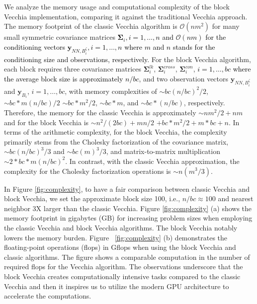 \documentclass[12pt]{article}
\begin{document}
We analyze the memory usage and computational complexity of the block Vecchia implementation, comparing it against the traditional Vecchia approach. The memory footprint of the classic Vecchia algorithm is $\mathcal{O}(nm^2)$ for many small symmetric covariance matrices \textcolor{black}{$\boldsymbol{\Sigma}_{i}, i=1, \ldots, n$ and $\mathcal{O}(nm)$ for the conditioning vectors $\boldsymbol{y}_{NN, B^{\zeta}_i}, i=1, \ldots, n$ where $m$ and $n$ stands for the conditioning size and observations, respectively.} 
For the block Vecchia algorithm, each block requires three covariance matrices $\boldsymbol{\Sigma}_i^{lk}$, $\boldsymbol{\Sigma}_i^{cross}$, $\boldsymbol{\Sigma}_i^{con}$, \textcolor{black}{$i=1, \ldots, bc$ where the average block size is approximately $n/bc$},  and two observation vectors $\boldsymbol{y}_{NN, B^{\zeta}_i}$ and $\boldsymbol{y}_{B_i}$, $i=1, \ldots, bc$, with memory complexities of $\sim{bc(n/bc)^2/2}$, $\sim{bc*m(n/bc)/2}$ $\sim{bc*m^2/2}$, $\sim{bc*m}$, and $\sim{bc*(n/bc)}$, respectively. Therefore, the memory for the classic Vecchia is approximately $\sim{nm^2/2 + nm}$ and for the block Vecchia is $\sim{n^2/(2bc)+mn/2}$ ${+ bc*m^2/2 + m*bc + n}$. In terms of the arithmetic complexity, for the block Vecchia, the complexity primarily stems from the Cholesky factorization of the covariance matrix, $\sim{bc(n/bc)^3/3}$ and $\sim{bc(m)^3/3}$, and matrix-to-matrix multiplication $\sim{2*bc*m(n/bc)^2}$. In contrast, with the classic Vecchia approximation, the complexity for the Cholesky factorization operations is $\sim{n(m^3/3)}$. 




In Figure \ref{fig:complexity}, to have a fair comparison between classic Vecchia and block Vecchia, we set the approximate block size 100, i.e., $n/bc \approx 100$ and nearest neighbor 3X larger than the classic Vecchia.  Figure \ref{fig:complexity} (a) shows the memory footprint in gigabytes (GB) for increasing problem sizes when employing the classic Vecchia and block Vecchia algorithms. The block Vecchia notably lowers the memory burden. Figure ~\ref{fig:complexity} (b) demonstrates the floating-point operations (flops) in Gflops when using the block Vecchia and classic algorithms. The figure shows a comparable computation in the number of required flops for the Vecchia algorithm. The observations underscore that the block Vecchia creates computationally intensive tasks compared to the classic Vecchia and then it inspires us to utilize the modern GPU architecture to accelerate the computations. 
\end{document}
